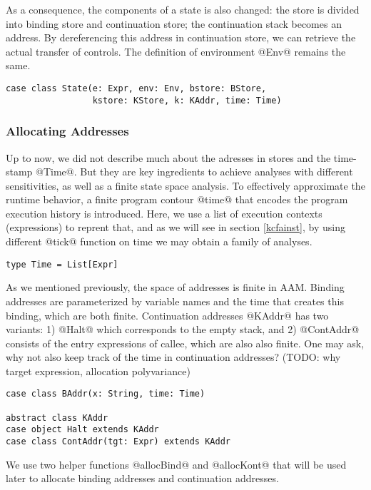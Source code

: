 \documentclass[acmsmall,review,anonymous]{acmart}\settopmatter{printfolios=true,printccs=false,printacmref=false}
\begin{document}
As a consequence, the components of a state is also changed: 
the store is divided into binding store and continuation store;
the continuation stack becomes an address.
By dereferencing this address in continuation store, we can retrieve the 
actual transfer of controls. The definition of environment @Env@
remains the same.

\begin{lstlisting}
case class State(e: Expr, env: Env, bstore: BStore, 
                 kstore: KStore, k: KAddr, time: Time)
\end{lstlisting}

\subsubsection{Allocating Addresses}
Up to now, we did not describe much about the adresses in stores and the 
time-stamp @Time@.
But they are key ingredients to achieve analyses with different sensitivities,
as well as a finite state space analysis.
To effectively approximate the runtime behavior, a finite 
program contour @time@ that encodes the program execution history is introduced.
Here, we use a list of execution contexts (expressions) to reprent that, and
as we will see in section \ref{kcfainst}, by using different @tick@
function on time we may obtain a family of analyses.

\begin{lstlisting}
type Time = List[Expr]
\end{lstlisting}

As we mentioned previously, the space of addresses is finite in AAM.
Binding addresses are parameterized by variable names and the time that creates this binding,
which are both finite.
Continuation addresses @KAddr@ has two variants: 
1) @Halt@ which corresponds to the empty stack, and
2) @ContAddr@ consists of the entry expressions of callee, which are also also
finite.
One may ask, why not also keep track of the time in continuation addresses?
(TODO: why target expression, allocation polyvariance)

\begin{lstlisting}
case class BAddr(x: String, time: Time)

abstract class KAddr
case object Halt extends KAddr
case class ContAddr(tgt: Expr) extends KAddr
\end{lstlisting}

We use two helper functions @allocBind@ and @allocKont@ that will be used later
to allocate binding addresses and continuation addresses.
\end{document}
